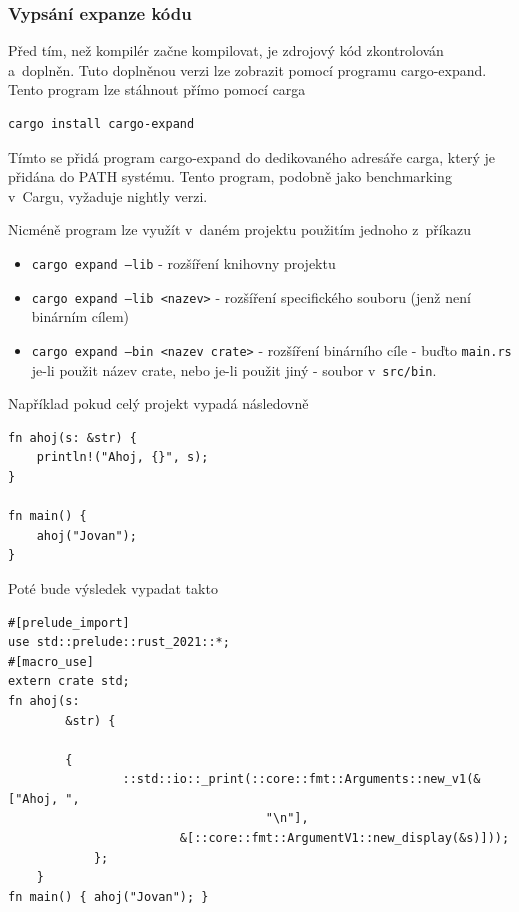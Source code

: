 \documentclass[a4paper, 12pt]{article} %
\newcommand{\bash}[1]{\texttt{#1}}
\begin{document}
        \subsubsection*{Vypsání expanze kódu}
            Před tím, než kompilér začne kompilovat, je zdrojový kód zkontrolován a~doplněn. Tuto doplněnou verzi lze zobrazit pomocí programu cargo-expand. Tento program lze stáhnout přímo pomocí carga
            \begin{verbatim}
cargo install cargo-expand
            \end{verbatim}
            
            Tímto se přidá program cargo-expand do dedikovaného adresáře carga, který je přidána do PATH systému. Tento program, podobně jako benchmarking v~Cargu, vyžaduje nightly verzi.
            
            Nicméně program lze využít v~daném projektu použitím jednoho z~příkazu
            \begin{itemize}
                \item \bash{cargo expand --lib} - rozšíření knihovny projektu
                \item \bash{cargo expand --lib <nazev>} - rozšíření specifického souboru (jenž není binárním cílem)
                \item \bash{cargo expand --bin <nazev crate>} - rozšíření binárního cíle - buďto \texttt{main.rs} je-li použit název crate, nebo je-li použit jiný - soubor v~\texttt{src/bin}.
            \end{itemize}

            Například pokud celý projekt vypadá následovně
            \begin{verbatim}
fn ahoj(s: &str) {
    println!("Ahoj, {}", s);
}

fn main() {
    ahoj("Jovan");
}
            \end{verbatim}
            
            Poté bude výsledek vypadat takto
            \begin{verbatim}
#[prelude_import]
use std::prelude::rust_2021::*;
#[macro_use]
extern crate std;
fn ahoj(s:
        &str) {

        {
                ::std::io::_print(::core::fmt::Arguments::new_v1(&["Ahoj, ",
                                    "\n"],
                        &[::core::fmt::ArgumentV1::new_display(&s)]));
            };
    }
fn main() { ahoj("Jovan"); }
            \end{verbatim}
            
\end{document}
